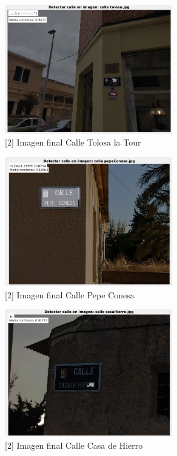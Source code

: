 \documentclass[12pt]{article}
\begin{document}
	\begin{figure}[h!]
		\begin{center}
			\includegraphics[width=0.65\textwidth]{img/2_8.png}
			\caption{[2] Imagen final Calle Tolosa la Tour}
		\end{center}
	\end{figure}
	
	\pagebreak
	
	\begin{figure}[h!]
		\begin{center}
			\includegraphics[width=0.65\textwidth]{img/2_9.png}
			\caption{[2] Imagen final Calle Pepe Conesa}
		\end{center}
	\end{figure}
	
	\begin{figure}[h!]
		\begin{center}
			\includegraphics[width=0.65\textwidth]{img/2_10.png}
			\caption{[2] Imagen final Calle Casa de Hierro}
		\end{center}
	\end{figure}
	
\end{document}
